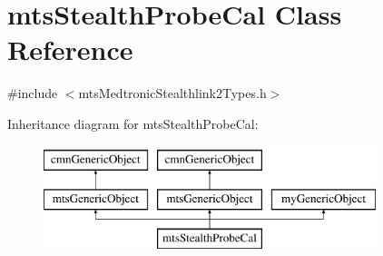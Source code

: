 \hypertarget{classmts_stealth_probe_cal}{}\section{mts\+Stealth\+Probe\+Cal Class Reference}
\label{classmts_stealth_probe_cal}


{\ttfamily \#include $<$mts\+Medtronic\+Stealthlink2\+Types.\+h$>$}

Inheritance diagram for mts\+Stealth\+Probe\+Cal\+:\begin{figure}[H]
\begin{center}
\leavevmode
\includegraphics[height=3.000000cm]{d2/dd0/classmts_stealth_probe_cal}
\end{center}
\end{figure}
